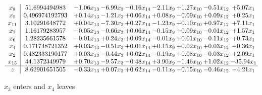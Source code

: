 \documentclass[9pt]{article}
\begin{document}
 \[\begin{array}{c| c c@{\hskip 2pt} c@{\hskip 2pt} c@{\hskip 2pt} c@{\hskip 2pt} c@{\hskip 2pt} c@{\hskip 2pt} c@{\hskip 2pt} }
 x_{8}   &  51.6994494983 & -1.06 x_{13} & -6.99 x_{3} & -0.16 x_{14} & -2.11 x_{9} & +  1.27 x_{10} & -0.51 x_{12} & +  5.07 x_{1}\\
 x_{5}   &  0.496974192793 & +  0.14 x_{13} & -1.21 x_{3} & +  0.06 x_{14} & +  0.08 x_{9} & -0.09 x_{10} & +  0.09 x_{12} & +  0.25 x_{1}\\
 x_{11}   &  3.10291648772 & +  0.04 x_{13} & -7.30 x_{3} & +  0.27 x_{14} & -1.23 x_{9} & +  0.10 x_{10} & +  0.97 x_{12} & +  7.11 x_{1}\\
 x_{7}   &  1.16179283957 & -0.05 x_{13} & -0.66 x_{3} & +  0.06 x_{14} & -0.15 x_{9} & +  0.09 x_{10} & -0.01 x_{12} & +  1.57 x_{1}\\
 x_{6}   &  1.28235661578 & -0.01 x_{13} & +  0.24 x_{3} & +  0.09 x_{14} & -0.01 x_{9} & +  0.01 x_{10} & -0.11 x_{12} & +  0.73 x_{1}\\
 x_{4}   &  0.171748721352 & +  0.03 x_{13} & -0.51 x_{3} & +  0.01 x_{14} & +  0.15 x_{9} & +  0.02 x_{10} & +  0.03 x_{12} & -0.36 x_{1}\\
 x_{2}   &  0.482333190177 & +  0.03 x_{13} & -0.44 x_{3} & +  0.02 x_{14} & -0.19 x_{9} & +  0.08 x_{10} & -0.03 x_{12} & +  2.09 x_{1}\\
 x_{15}   &  44.1372349979 & +  0.70 x_{13} & -9.57 x_{3} & -0.48 x_{14} & +  3.90 x_{9} & -1.46 x_{10} & +  1.02 x_{12} & -35.94 x_{1}\\
\hline
z    &  8.62901651505 & -0.33 x_{13} & +  0.07 x_{3} & +  0.62 x_{14} & -0.11 x_{9} & -0.15 x_{10} & -0.46 x_{12} & -4.21 x_{1}\\
\end{array}\]


 $ x_{3} $ enters and $ x_{4} $ leaves 
\end{document}
